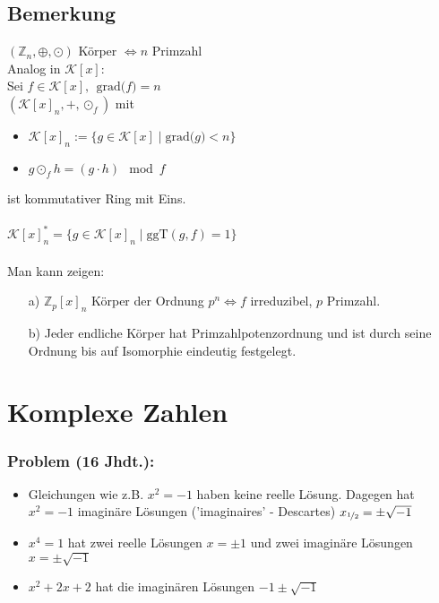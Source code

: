 \documentclass[a4paper, 12pt,titlepage, pdf, headsepline]{scrartcl}
\newcommand{\grad}[1]{\textrm{grad(}#1\textrm{)}}
\newcommand{\K}{\mathcal{K}}
\renewcommand{\>}{\rightarrow}
\renewcommand{\*}{\cdot}
\begin{document}
		      	\subsection{Bemerkung}
		      	\label{4.40}
		      	$(\mathds{Z}_n, \oplus, \odot)$ Körper $\Leftrightarrow n$ Primzahl \\
		      	Analog in $\K[x]$: \\
		      	Sei $f \in \K[x], ~~\grad{f} = n$ \\
		      	$(\K[x]_n, + , \odot_f)$ mit 
		      	\begin{itemize}
		      		\item $\K[x]_n := \{g \in \K[x] \mid \grad{g} < n \}$
		      		\item $g \odot_f h = (g \cdot h) \mod f$
		      	\end{itemize}
		      	ist kommutativer Ring mit Eins.\\
		      	\\
		      	$\K[x]_n^* = \{g \in \K[x]_n \mid \text{ggT}(g,f) = 1 \}$\\
		      	\\
		      	Man kann zeigen: 
		      	\begin{itemize}
		      		\item[a)] $\mathds{Z}_p[x]_n$ Körper der Ordnung $p^n \Leftrightarrow f$ irreduzibel, $p$ Primzahl.
		      		\item[b)] Jeder endliche Körper hat Primzahlpotenzordnung und ist durch seine Ordnung bis auf Isomorphie eindeutig festgelegt.
		      	\end{itemize}
		      	\newpage
		      	\section{Komplexe Zahlen}
		      	\label{5}
		      	\subsubsection*{Problem (16 Jhdt.):} 
		      	\begin{itemize}
		      		\item Gleichungen wie z.B. $x^2 = -1$ haben keine reelle Lösung. Dagegen hat\\ $x^2 = -1$ imaginäre Lösungen ('imaginaires' - Descartes) $x_{\nicefrac{1}{2}} = \pm \sqrt{-1}$
		      		\item $x^4 = 1$ hat zwei reelle Lösungen $x = \pm 1$ und zwei imaginäre Lösungen $x = \pm \sqrt{-1}$
		      		\item $x^2 + 2x +2$ hat die imaginären Lösungen $-1 \pm \sqrt{-1}$
		      	\end{itemize}
\end{document}
